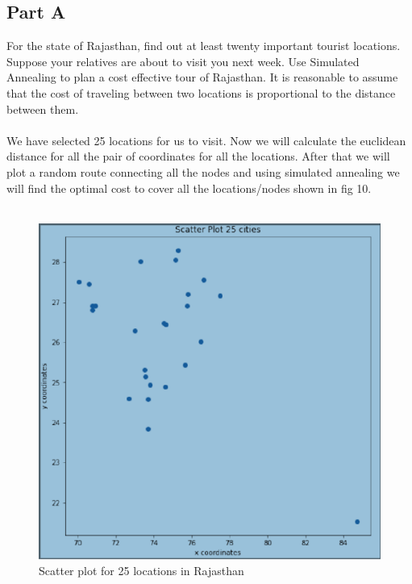\documentclass[conference]{IEEEtran}
\begin{document}
\subsection{Part A}
 For the state of Rajasthan, find out at least twenty important tourist locations.  Suppose your relatives are about to visit you next week.  Use Simulated Annealing to plan a cost effective tour of Rajasthan.  It is reasonable to assume that the cost of traveling between two locations is proportional to the distance between them.
\\
\\
We have selected 25 locations for us to visit. Now we will calculate the euclidean distance for all the pair of coordinates for all the locations. After that we will plot a random route connecting all the nodes and using simulated annealing we will find the optimal cost to cover all the locations/nodes shown in fig 10.\cite{}
\\
\\
\begin{figure}[htbp]
\centerline{\includegraphics[scale=0.8]{sca.png}}
\caption{Scatter plot for 25 locations in Rajasthan}
\label{fig}
\end{figure}
\\
\\
\end{document}
